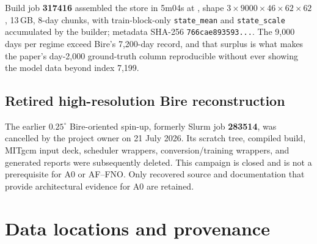 \documentclass[11pt]{article}
\newcommand{\AF}{AF--FNO}
\begin{document}
Build job \textbf{317416} assembled the store in 5m04s at
,
shape \(3\times9000\times46\times62\times62\), 13\,GB, 8-day chunks, with
train-block-only \texttt{state\_mean} and \texttt{state\_scale} accumulated by
the builder; metadata SHA-256 \texttt{766cae893593...}.  The 9,000 days per
regime exceed Bire's 7,200-day record, and that surplus is what makes the
paper's day-2,000 ground-truth column reproducible without ever showing the
model data beyond index 7,199.

\subsection{Retired high-resolution Bire reconstruction}

The earlier $0.25^\circ$ Bire-oriented spin-up, formerly Slurm job \textbf{283514},
was cancelled by the project owner on 21 July 2026.  Its scratch tree, compiled build,
MITgcm input deck, scheduler wrappers, conversion/training wrappers, and generated
reports were subsequently deleted.  This campaign is closed and is not a prerequisite
for A0 or \AF{}.  Only recovered source and documentation that provide architectural
evidence for A0 are retained.

\section{Data locations and provenance}
\end{document}
